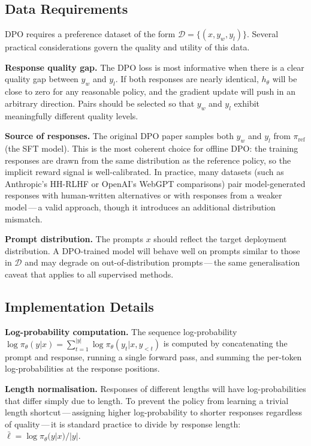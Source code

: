 \subsection{Data Requirements}

DPO requires a preference dataset of the form $\mathcal{D} = \{(x, y_w, y_l)\}$. Several practical considerations govern the quality and utility of this data.

\textbf{Response quality gap.} The DPO loss is most informative when there is a clear quality gap between $y_w$ and $y_l$. If both responses are nearly identical, $h_\theta$ will be close to zero for any reasonable policy, and the gradient update will push in an arbitrary direction. Pairs should be selected so that $y_w$ and $y_l$ exhibit meaningfully different quality levels.

\textbf{Source of responses.} The original DPO paper samples both $y_w$ and $y_l$ from $\pi_\mathrm{ref}$ (the SFT model). This is the most coherent choice for offline DPO: the training responses are drawn from the same distribution as the reference policy, so the implicit reward signal is well-calibrated. In practice, many datasets (such as Anthropic's HH-RLHF or OpenAI's WebGPT comparisons) pair model-generated responses with human-written alternatives or with responses from a weaker model\,---\,a valid approach, though it introduces an additional distribution mismatch.

\textbf{Prompt distribution.} The prompts $x$ should reflect the target deployment distribution. A DPO-trained model will behave well on prompts similar to those in $\mathcal{D}$ and may degrade on out-of-distribution prompts\,---\,the same generalisation caveat that applies to all supervised methods.

\subsection{Implementation Details}

\textbf{Log-probability computation.} The sequence log-probability $\log\pi_\theta(y|x) = \sum_{t=1}^{|y|} \log\pi_\theta(y_t | x, y_{<t})$ is computed by concatenating the prompt and response, running a single forward pass, and summing the per-token log-probabilities at the response positions.

\textbf{Length normalisation.} Responses of different lengths will have log-probabilities that differ simply due to length. To prevent the policy from learning a trivial length shortcut\,---\,assigning higher log-probability to shorter responses regardless of quality\,---\,it is standard practice to divide by response length: $\bar\ell = \log\pi_\theta(y|x) / |y|$.


